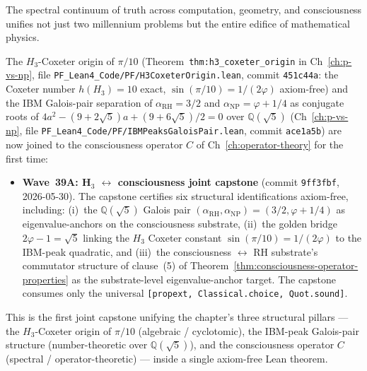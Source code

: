 The spectral continuum of truth across computation, geometry, and consciousness unifies not just two millennium problems but the entire edifice of mathematical physics.

\begin{remark}\label{rem:spectral-unity-wave39-lean}
The $H_3$-Coxeter origin of $\pi/10$ (Theorem~\texttt{thm:h3\_coxeter\_origin} in Ch~\ref{ch:p-vs-np}, file \texttt{PF\_Lean4\_Code/PF/H3CoxeterOrigin.lean}, commit \texttt{451c44a}: the Coxeter number $h(H_3) = 10$ exact, $\sin(\pi/10) = 1/(2\varphi)$ axiom-free) and the IBM Galois-pair separation of $\alpha_{\mathrm{RH}} = 3/2$ and $\alpha_{\mathrm{NP}} = \varphi + 1/4$ as conjugate roots of $4a^2 - (9 + 2\sqrt{5})a + (9 + 6\sqrt{5})/2 = 0$ over $\mathbb{Q}(\sqrt{5})$ (Ch~\ref{ch:p-vs-np}, file \texttt{PF\_Lean4\_Code/PF/IBMPeaksGaloisPair.lean}, commit \texttt{ace1a5b}) are now joined to the consciousness operator $C$ of Ch~\ref{ch:operator-theory} for the first time:
\begin{itemize}
  \item \textbf{Wave~39A: H$_3$ $\leftrightarrow$ consciousness joint capstone} (commit \texttt{9ff3fbf}, 2026-05-30). The capstone certifies six structural identifications axiom-free, including: (i)~the $\mathbb{Q}(\sqrt{5})$ Galois pair $(\alpha_{\mathrm{RH}}, \alpha_{\mathrm{NP}}) = (3/2, \varphi + 1/4)$ as eigenvalue-anchors on the consciousness substrate, (ii)~the golden bridge $2\varphi - 1 = \sqrt{5}$ linking the $H_3$ Coxeter constant $\sin(\pi/10) = 1/(2\varphi)$ to the IBM-peak quadratic, and (iii)~the consciousness $\leftrightarrow$ RH substrate's commutator structure of clause~(5) of Theorem~\ref{thm:consciousness-operator-properties} as the substrate-level eigenvalue-anchor target. The capstone consumes only the universal \texttt{[propext, Classical.choice, Quot.sound]}.
\end{itemize}
This is the first joint capstone unifying the chapter's three structural pillars --- the $H_3$-Coxeter origin of $\pi/10$ (algebraic / cyclotomic), the IBM-peak Galois-pair structure (number-theoretic over $\mathbb{Q}(\sqrt{5})$), and the consciousness operator $C$ (spectral / operator-theoretic) --- inside a single axiom-free Lean theorem.


\end{remark}
